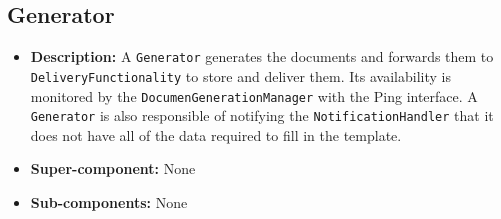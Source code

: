 \documentclass[a4paper,10pt]{article}
\begin{document}
\subsection{Generator}
\begin{itemize}
    \item \textbf{Description:} A \texttt{Generator} generates the documents and forwards them to \texttt{DeliveryFunctionality} to store and deliver them. Its availability is monitored by the \texttt{DocumenGenerationManager} with the Ping interface. A \texttt{Generator} is also responsible of notifying the \texttt{NotificationHandler} that it does not have all of the data required to fill in the template.
    \item \textbf{Super-component:} None
    \item \textbf{Sub-components:} None
\end{itemize}
\end{document}
